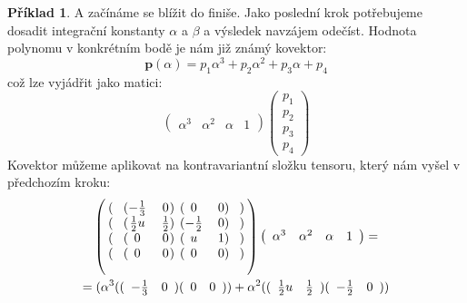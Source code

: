 \documentclass[a5paper,12pt]{amsbook}
\theoremstyle{definition}
\newtheorem{example}{Příklad}[chapter]
\newcommand{\myvec}[1]{\bm{#1}}
\begin{document}
\begin{example}
\medskip\noindent
A začínáme se blížit do finiše. Jako poslední krok potřebujeme dosadit integrační konstanty $\alpha$ a $\beta$
a výsledek navzájem odečíst. Hodnota polynomu v konkrétním bodě je nám již známý kovektor:
\begin{equation*}
\myvec{p}(\alpha) = p_1\alpha^3 + p_2\alpha^2 + p_3\alpha + p_4
\end{equation*}
což lze vyjádřit jako matici:
\begin{equation*}
\left(\begin{array}{cccc}\alpha^3 & \alpha^2 & \alpha & 1\end{array}\right)
\left(\begin{array}{c}p_1 \\ p_2 \\ p_3 \\ p_4 \end{array}\right)
\end{equation*}
Kovektor můžeme aplikovat na kontravariantní složku tensoru, který nám vyšel v předchozím kroku:
\begin{equation*}
\begin{split}
&\left(\begin{blockarray}{cccccc}
\begin{block}{(c(cc)(cc)c)}
& -\frac{1}{3} & 0 & 0 & 0 &\\
\end{block}
\begin{block}{(c(cc)(cc)c)}
& \frac{1}{2}u & \frac{1}{2} & -\frac{1}{2} & 0 & \\
\end{block}
\begin{block}{(c(cc)(cc)c)}
& 0 & 0 & u & 1 &\\
\end{block}
\begin{block}{(c(cc)(cc)c)}
& 0 & 0 & 0 & 0 &\\
\end{block}
\end{blockarray}\right)
\left(\begin{array}{cccc}\alpha^3 & \alpha^2 & \alpha & 1\end{array}\right)
= \\ = &
\;(
\alpha^3((\begin{array}{cc}-\frac{1}{3} & 0\end{array})(\begin{array}{cc}0 & 0\end{array}))
  + \alpha^2((\begin{array}{cc}\frac{1}{2}u & \frac{1}{2}\end{array})(\begin{array}{cc}-\frac{1}{2} & 0\end{array})) \\

\end{split}
\end{equation*}
\end{example}
\end{document}
